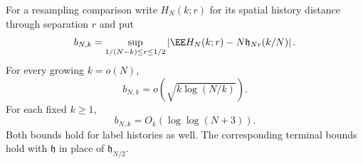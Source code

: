 \documentclass[11pt,letterpaper]{article}
\begin{document}
\begin{lemma}
\label{lem:cutoff-profile-mean}
For a resampling comparison write $H_N(k;r)$ for its
spatial history distance through separation $r$ and put
\[
 b_{N,k}=
 \sup_{1/(N-k)\le r\le1/2}
   \left|\EE H_N(k;r)-N\mathfrak h_{Nr}(k/N)\right|.
\]
For every growing $k=o(N)$,
\begin{equation}\label{eq:growing-cutoff-profile-mean}
 b_{N,k}=o(\sqrt{k\log(N/k)}).
\end{equation}
For each fixed $k\ge1$,
\begin{equation}\label{eq:fixed-cutoff-profile-mean}
 b_{N,k}=O_k(\log\log(N+3)).
\end{equation}
Both bounds hold for label histories as well.
The corresponding terminal bounds hold with
$\mathfrak h$ in place of $\mathfrak h_{N/2}$.
\end{lemma}
\end{document}
